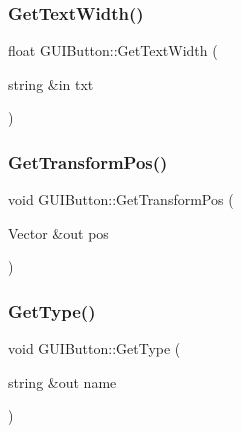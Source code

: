 \hypertarget{class_g_u_i_button_ac20d7e21b029f94389215a5ed552979f}{}\label{class_g_u_i_button_ac20d7e21b029f94389215a5ed552979f} 
\subsubsection{\texorpdfstring{Get\+Text\+Width()}{GetTextWidth()}}
{\footnotesize\ttfamily float G\+U\+I\+Button\+::\+Get\+Text\+Width (\begin{DoxyParamCaption}\item[{string \&in}]{txt }\end{DoxyParamCaption})}

\hypertarget{class_g_u_i_button_a32f75c0a9ef5081dcb85b666b350c530}{}\label{class_g_u_i_button_a32f75c0a9ef5081dcb85b666b350c530} 
\subsubsection{\texorpdfstring{Get\+Transform\+Pos()}{GetTransformPos()}}
{\footnotesize\ttfamily void G\+U\+I\+Button\+::\+Get\+Transform\+Pos (\begin{DoxyParamCaption}\item[{Vector \&out}]{pos }\end{DoxyParamCaption})}

\hypertarget{class_g_u_i_button_a40cd0e7024e6b16a88150c688e77346f}{}\label{class_g_u_i_button_a40cd0e7024e6b16a88150c688e77346f} 
\subsubsection{\texorpdfstring{Get\+Type()}{GetType()}}
{\footnotesize\ttfamily void G\+U\+I\+Button\+::\+Get\+Type (\begin{DoxyParamCaption}\item[{string \&out}]{name }\end{DoxyParamCaption})}

\hypertarget{class_g_u_i_button_abe241935b3e7eb3fcb82628b4fcb3632}{}\label{class_g_u_i_button_abe241935b3e7eb3fcb82628b4fcb3632} 
